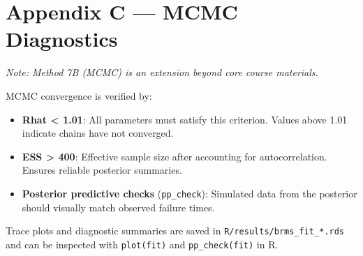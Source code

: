 \documentclass[
]{article}
\providecommand{\tightlist}{%
  \setlength{\itemsep}{0pt}\setlength{\parskip}{0pt}}
\begin{document}
\section{Appendix C --- MCMC
Diagnostics}\label{appendix-c-mcmc-diagnostics}

\emph{Note: Method 7B (MCMC) is an extension beyond core course
materials.}

MCMC convergence is verified by:

\begin{itemize}
\tightlist
\item
  \textbf{Rhat \textless{} 1.01}: All parameters must satisfy this
  criterion. Values above 1.01 indicate chains have not converged.
\item
  \textbf{ESS \textgreater{} 400}: Effective sample size after
  accounting for autocorrelation. Ensures reliable posterior summaries.
\item
  \textbf{Posterior predictive checks} (\texttt{pp\_check}): Simulated
  data from the posterior should visually match observed failure times.
\end{itemize}

Trace plots and diagnostic summaries are saved in
\texttt{R/results/brms\_fit\_*.rds} and can be inspected with
\texttt{plot(fit)} and \texttt{pp\_check(fit)} in R.
\end{document}
